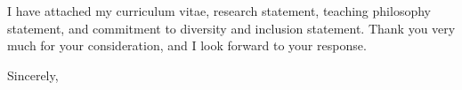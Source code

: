\documentclass{letter}
\begin{document}
\begin{letter}{}
I have attached
my curriculum vitae,
research statement,
teaching philosophy statement,
and commitment to diversity and inclusion statement.
%
Thank you very much for your consideration, and I look forward to your response.

\closing{Sincerely,}

\end{letter}
\end{document}
